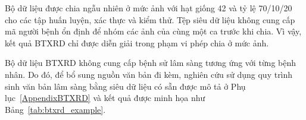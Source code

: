 \begin{table}[htbp]
\centering
\small
{}
\caption{Phân bổ các lớp đơn nhãn sau chuẩn hóa trong bộ dữ liệu BTXRD}
\label{tab:btxrd_pathologies}
\end{table}

\clearpage

Bộ dữ liệu được chia ngẫu nhiên ở mức ảnh với hạt giống 42 và tỷ lệ 70/10/20 cho các tập huấn luyện, xác thực và kiểm thử. Tệp siêu dữ liệu không cung cấp mã người bệnh ổn định để nhóm các ảnh của cùng một ca trước khi chia. Vì vậy, kết quả BTXRD chỉ được diễn giải trong phạm vi phép chia ở mức ảnh.

Bộ dữ liệu BTXRD không cung cấp bệnh sử lâm sàng tương ứng với từng bệnh nhân. Do đó, để bổ sung nguồn văn bản đi kèm, nghiên cứu sử dụng quy trình sinh văn bản lâm sàng bằng siêu dữ liệu có sẵn được mô tả ở Phụ lục~\ref{AppendixBTXRD} và kết quả được minh họa như Bảng~\ref{tab:btxrd_example}.

